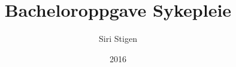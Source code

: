 \documentclass[a4paper,norsk,12pt]{report}
\begin{document}
  \author{Siri Stigen}
  \date{2016}
  \title{Bacheloroppgave Sykepleie}

  \tableofcontents

  \clearpage

  
  \clearpage

  \begingroup %
  \raggedright %
  \nocite{*} %
  
  \endgroup %
\end{document}
